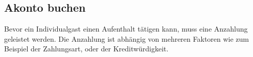 \documentclass[../SubfileFeatures.tex]{subfiles}
\begin{document}
    \subsection{Akonto buchen}
    Bevor ein Individualgast einen Aufenthalt tätigen kann, muss eine Anzahlung geleistet werden.
    Die Anzahlung ist abhängig von mehreren Faktoren wie zum Beispiel der Zahlungsart, oder der Kreditwürdigkeit.
\end{document}
